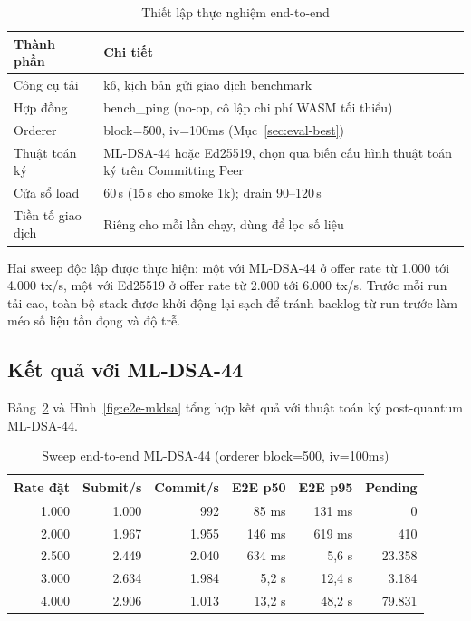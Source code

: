 \begin{table}[H]
\centering
\caption{Thiết lập thực nghiệm end-to-end}
\label{tab:e2e-setup}
\begin{tabular}{@{}p{4.5cm}p{8cm}@{}}
\toprule
Thành phần & Chi tiết \\
\midrule
Công cụ tải & k6, kịch bản gửi giao dịch benchmark \\
Hợp đồng & bench\_ping (no-op, cô lập chi phí WASM tối thiểu) \\
Orderer & block=500, iv=100ms (Mục~\ref{sec:eval-best}) \\
Thuật toán ký & ML-DSA-44 hoặc Ed25519, chọn qua biến cấu hình thuật toán ký trên Committing Peer \\
Cửa sổ load & 60\,s (15\,s cho smoke 1k); drain 90--120\,s \\
Tiền tố giao dịch & Riêng cho mỗi lần chạy, dùng để lọc số liệu \\
\bottomrule
\end{tabular}
\end{table}

Hai sweep độc lập được thực hiện: một với ML-DSA-44 ở offer rate từ 1.000 tới
4.000 tx/s, một với Ed25519 ở offer rate từ 2.000 tới 6.000 tx/s. Trước mỗi
run tải cao, toàn bộ stack được khởi động lại sạch để tránh backlog từ run
trước làm méo số liệu tồn đọng và độ trễ.

\subsection{Kết quả với ML-DSA-44}
\label{sec:e2e-mldsa}

Bảng~\ref{tab:e2e-mldsa} và Hình~\ref{fig:e2e-mldsa} tổng hợp kết quả với
thuật toán ký post-quantum ML-DSA-44.

\begin{table}[H]
\centering
\caption{Sweep end-to-end ML-DSA-44 (orderer block=500, iv=100ms)}
\label{tab:e2e-mldsa}
\begin{tabular}{@{}rrrrrr@{}}
\toprule
Rate đặt & Submit/s & Commit/s & E2E p50 & E2E p95 & Pending \\
\midrule
1.000  & 1.000 & 992  & 85 ms   & 131 ms  & 0 \\
2.000  & 1.967 & 1.955 & 146 ms  & 619 ms  & 410 \\
2.500  & 2.449 & 2.040 & 634 ms  & 5,6 s   & 23.358 \\
3.000  & 2.634 & 1.984 & 5,2 s   & 12,4 s  & 3.184 \\
4.000  & 2.906 & 1.013 & 13,2 s  & 48,2 s  & 79.831 \\
\bottomrule
\end{tabular}
\end{table}

